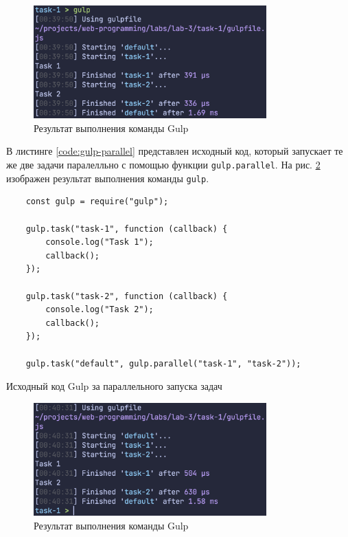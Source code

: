 \documentclass[a4paper, 14pt]{extarticle}
\newenvironment{code}{\captionsetup{type=listing}}{}
\begin{document}
\begin{figure}[H]
  \centering
  \includegraphics[width=0.8\textwidth]{images/gulp-series.png}
  \caption{Результат выполнения команды Gulp}
  \label{fig:gulp-series}
\end{figure}

В листинге \ref{code:gulp-parallel} представлен исходный код, который запускает
те же две задачи паралелльно с помощью функции \texttt{gulp.parallel}. На рис.
\ref{fig:gulp-parallel} изображен результат выполнения команды \texttt{gulp}.

\begin{code}
  \begin{verbatim}
    const gulp = require("gulp");

    gulp.task("task-1", function (callback) {
        console.log("Task 1");
        callback();
    });

    gulp.task("task-2", function (callback) {
        console.log("Task 2");
        callback();
    });

    gulp.task("default", gulp.parallel("task-1", "task-2"));
  \end{verbatim}
  \caption{Исходный код Gulp за параллельного запуска задач}
  \label{code:gulp-parallel}
\end{code}

\begin{figure}[H]
  \centering
  \includegraphics[width=0.8\textwidth]{images/gulp-parallel.png}
  \caption{Результат выполнения команды Gulp}
  \label{fig:gulp-parallel}
\end{figure}
\end{document}
